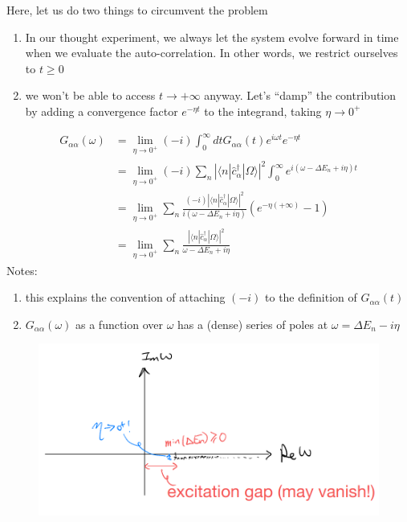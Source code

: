 Here, let us do two things to circumvent the problem
\begin{enumerate}
    \item In our thought experiment, we always let the system evolve forward in time when we evaluate the auto-correlation. In other words, we restrict ourselves to $t\geq 0$
    \item we won't be able to access $t\to +\infty$ anyway. Let's ``damp'' the contribution by adding a convergence factor $e^{-\eta t}$ to the integrand, taking $\eta\to 0^+$
\end{enumerate}
\begin{align*}
    G_{\alpha \alpha}\left( \omega \right) &=\lim_{\eta \rightarrow 0^+} \left( -i \right) \int_0^{\infty}{dtG_{\alpha \alpha}\left( t \right) e^{i\omega t}e^{-\eta t}}\\
    &=\lim_{\eta \rightarrow 0^+} \left( -i \right) \sum_n{\left| \langle n|\hat{c}_{\alpha}^{\dagger}|\Omega \rangle \right|^2\int_0^{\infty}{e^{i\left( \omega -\Delta E_n+i\eta \right) t}}}\\
    &=\lim_{\eta \rightarrow 0^+} \sum_n{\frac{\left( -i \right) \left| \langle n|\hat{c}_{\alpha}^{\dagger}|\Omega \rangle \right|^2}{i\left( \omega -\Delta E_n+i\eta \right)}\left( e^{-\eta \left( +\infty \right)}-1 \right)}\\
    &=\lim_{\eta \rightarrow 0^+} \sum_n{\frac{\left| \langle n|\hat{c}_{\alpha}^{\dagger}|\Omega \rangle \right|^2}{\omega -\Delta E_n+i\eta}}
\end{align*}
Notes:
\begin{enumerate}
    \item this explains the convention of attaching $(-i)$ to the definition of $G_{\alpha\alpha}(t)$
    \item $G_{\alpha\alpha}(\omega)$ as a function over $\omega$ has a (dense) series of poles at $\omega=\Delta E_n-i\eta$
\end{enumerate}

\begin{figure}[ht]
    \centering
    \includegraphics[width=\textwidth]{jupyterbook/data/fig/lec05-fig00.png}
\end{figure}

